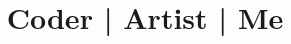 \documentclass[11pt,a4paper,sans]{moderncv}        %
\title{Coder | Artist | Me}                               %
\providecommand{\variant}{plain}
\begin{document}
\makecvtitle



\clearpage
%
%
%
%
%
%

\end{document}
